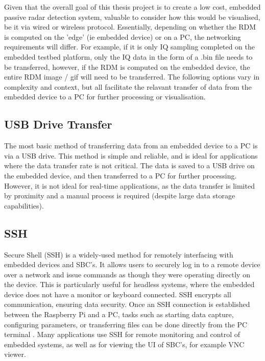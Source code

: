 Given that the overall goal of this thesis project is to create a low cost, embedded passive radar detection system, valuable to consider how this would be visualised, be it via wired or wireless protocol. Essentially, depending on whether the RDM is computed on the 'edge' (ie embedded device) or on a PC, the networking requirements will differ. For example, if it is only IQ sampling completed on the embedded testbed platform, only the IQ data in the form of a .bin file needs to be transferred, however, if the RDM is computed on the embedded device, the entire RDM image / gif will need to be transferred. The following options vary in complexity and context, but all facilitate the relavant transfer of data from the embedded device to a PC for further processing or visualisation.

\subsection{USB Drive Transfer}
The most basic method of transferring data from an embedded device to a PC is via a USB drive. This method is simple and reliable, and is ideal for applications where the data transfer rate is not critical. The data is saved to a USB drive on the embedded device, and then transferred to a PC for further processing. However, it is not ideal for real-time applications, as the data transfer is limited by proximity and a manual process is required (despite large data storage capabilities).

\subsection{SSH}
Secure Shell (SSH) is a widely-used method for remotely interfacing with embedded devices and SBC's. It allows users to securely log in to a remote device over a network and issue commands as though they were operating directly on the device. This is particularly useful for headless systems, where the embedded device does not have a monitor or keyboard connected. SSH encrypts all communication, ensuring data security. Once an SSH connection is established between the Raspberry Pi and a PC, tasks such as starting data capture, configuring parameters, or transferring files can be done directly from the PC terminal \cite{SSHOverview}. Many applications use SSH for remote monitoring and control of embedded systems, as well as for viewing the UI of SBC's, for example VNC viewer.


